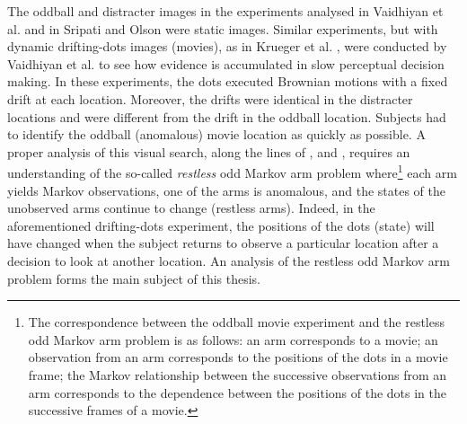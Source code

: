 The oddball and distracter images in the experiments analysed in Vaidhiyan et al. \cite{Vaidhiyan2017, vaidhiyan2012active, vaidhiyan2017learning} and in Sripati and Olson \cite{sripati2010global} were static images. Similar experiments, but with dynamic drifting-dots images (movies), as in Krueger et al. \cite{krueger2017evidence}, were conducted by Vaidhiyan et al. to see how evidence is accumulated in slow perceptual decision making. In these experiments, the dots executed Brownian motions with a fixed drift at each location. Moreover, the drifts were identical in the distracter locations and were different from the drift in the oddball location. Subjects had to identify the oddball (anomalous) movie location as quickly as possible. A proper analysis of this visual search, along the lines of  \cite{Vaidhiyan2017}, \cite{vaidhiyan2012active} and \cite{vaidhiyan2017learning}, requires an understanding of the so-called \emph{restless} odd Markov arm problem where\footnote{The correspondence between the oddball movie experiment and the restless odd Markov arm problem is as follows: an arm corresponds to a movie; an observation from an arm corresponds to the positions of the dots in a movie frame; the Markov relationship between the successive observations from an arm corresponds to the dependence between the positions of the dots in the successive frames of a movie.} each arm yields Markov observations, one of the arms is anomalous, and the states of the unobserved arms continue to change (restless arms). Indeed, in the aforementioned drifting-dots experiment, the positions of the dots (state) will have changed when the subject returns to observe a particular location after a decision to look at another location. An analysis of the restless odd Markov arm problem forms the main subject of this thesis.

 
